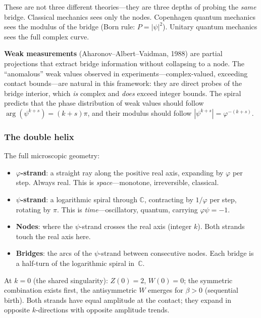 \documentclass[12pt,a4paper]{article}
\begin{document}
\noindent These are not three different theories---they are three depths of probing the \emph{same} bridge. Classical mechanics sees only the nodes. Copenhagen quantum mechanics sees the modulus of the bridge (Born rule: $P = |\psi|^2$). Unitary quantum mechanics sees the full complex curve.

\textbf{Weak measurements} (Aharonov--Albert--Vaidman, 1988) are partial projections that extract bridge information without collapsing to a node. The ``anomalous'' weak values observed in experiments---complex-valued, exceeding contact bounds---are natural in this framework: they are direct probes of the bridge interior, which \emph{is} complex and \emph{does} exceed integer bounds. The spiral predicts that the phase distribution of weak values should follow $\arg(\psi^{k+s}) = (k{+}s)\pi$, and their modulus should follow $|\psi^{k+s}| = \varphi^{-(k+s)}$.

\subsubsection*{The double helix}

The full microscopic geometry:
\begin{itemize}
\item \textbf{$\varphi$-strand}: a straight ray along the positive real axis, expanding by $\varphi$ per step. Always real. This is \emph{space}---monotone, irreversible, classical.

\item \textbf{$\psi$-strand}: a logarithmic spiral through $\mathbb{C}$, contracting by $1/\varphi$ per step, rotating by $\pi$. This is \emph{time}---oscillatory, quantum, carrying $\varphi\psi = -1$.

\item \textbf{Nodes}: where the $\psi$-strand crosses the real axis (integer $k$). Both strands touch the real axis here.

\item \textbf{Bridges}: the arcs of the $\psi$-strand between consecutive nodes. Each bridge is a half-turn of the logarithmic spiral in~$\mathbb{C}$.
\end{itemize}

At $k = 0$ (the shared singularity): $Z(0)=2$, $W(0)=0$; the symmetric combination exists first, the antisymmetric $W$ emerges for $\beta > 0$ (sequential birth). Both strands have equal amplitude at the contact; they expand in opposite $k$-directions with opposite amplitude trends.
\end{document}
